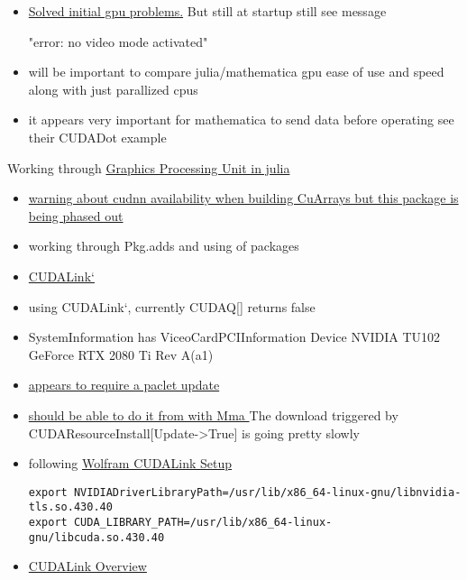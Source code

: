 \documentclass[hyperref,idxtotoc]{labbook}
\begin{document}


\begin{itemize}
\item 
\href{https://ubuntu-mate.community/t/grub-terminal-console-mode-error/7356/8}{Solved initial gpu problems.}  But still at startup still see message

"error: no  video mode activated"
\item will be important to compare julia/mathematica gpu ease of use and speed along with just parallized cpus
\item it appears very important for mathematica to send data  before operating see their CUDADot example
\end{itemize}

Working through
\href{https://nextjournal.com/sdanisch/julia-gpu-programming}{Graphics Processing Unit in julia}

\begin{itemize}
\item  \href{https://github.com/JuliaAttic/CUDNN.jl}{warning about cudnn availability when building CuArrays but this package is being phased out}
\item working through Pkg.adds and using of packages
\end{itemize}



\begin{itemize}
\item \href{https://reference.wolfram.com/language/CUDALink/guide/CUDALink.html}{CUDALink`}
\item using CUDALink`, currently CUDAQ[] returns false
\item SystemInformation has ViceoCardPCIInformation Device NVIDIA TU102 GeForce RTX 2080 Ti Rev A(a1)
\item \href{https://mathematica.stackexchange.com/questions/195348/mathematica-12-supported-gpus}{appears to require a paclet update}
\item \href{http://support.wolfram.com/kb/12498}{should be able to do it from with Mma }  The download triggered by CUDAResourceInstall[Update->True]  is going pretty slowly
\item following \href{https://reference.wolfram.com/language/CUDALink/tutorial/Setup.html}{Wolfram CUDALink Setup}
\begin{verbatim}
export NVIDIADriverLibraryPath=/usr/lib/x86_64-linux-gnu/libnvidia-tls.so.430.40
export CUDA_LIBRARY_PATH=/usr/lib/x86_64-linux-gnu/libcuda.so.430.40
\end{verbatim}
\item \href{https://reference.wolfram.com/language/CUDALink/tutorial/Overview.html}{CUDALink Overview}
\end{itemize}
\end{document}

